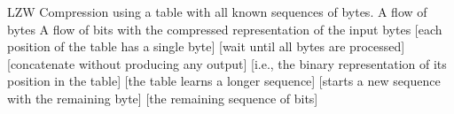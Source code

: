 \begin{algorithmic}[1]
    \Description LZW Compression using a table with all known sequences of bytes.
    \Input A flow of bytes
    \Output A flow of bits with the compressed representation of the input bytes
    \Statex
    [each position of the table has a single byte]
    [wait until all bytes are processed]
            [concatenate without producing any output]
        \Else
            [i.e., the binary representation of its position in the table]\label{alg:lzw:output}
            [the table learns a longer sequence]\label{alg:lzw:add-to-table}
            [starts a new sequence with the remaining byte]
        \EndIf
    \EndWhile
    [the remaining sequence of bits]
\end{algorithmic}